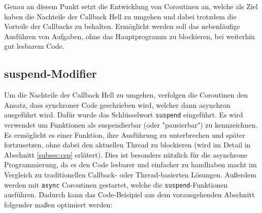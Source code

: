 \documentclass[fontsize=12pt,paper=a4,twoside=semi,parskip=half-,headsepline,headinclude]{scrreprt}
\begin{document}
Genau an diesem Punkt setzt die Entwicklung von Coroutinen an, welche als Ziel haben die Nachteile der Callback Hell zu umgehen und dabei trotzdem die Vorteile der Callbacks zu behalten\cite{Elizarov2017a}. Ermöglicht werden soll das nebenläufige Ausführen von Aufgaben, ohne das Hauptprogramm zu blockieren, bei weiterhin gut lesbarem Code.


\subsection{suspend-Modifier}
\label{subsec:suspend}

Um die Nachteile der Callback Hell zu umgehen, verfolgen die Coroutinen den Ansatz, dass synchroner Code geschrieben wird, welcher dann asynchron ausgeführt wird. Dafür wurde das Schlüsselwort \texttt{suspend} eingeführt\cite{Akhin2024}. Es wird verwendet um Funktionen als suspendierbar (oder "pausierbar") zu kennzeichnen. Es ermöglicht es einer Funktion, ihre Ausführung zu unterbrechen und später fortzusetzen, ohne dabei den aktuellen Thread zu blockieren (wird im Detail in Abschnitt \ref{subsec:csp} erlätert). Dies ist besonders nützlich für die asynchrone Programmierung, da es den Code lesbarer und einfacher zu handhaben macht im Vergleich zu traditionellen Callback- oder Thread-basierten Lösungen. Außerdem werden mit \texttt{async} Coroutinen gestartet, welche die \texttt{suspend}-Funktionen ausführen. Dadurch kann das Code-Beisipiel aus dem vorausgehenden Abschnitt folgender maßen optimiert werden:
\end{document}
